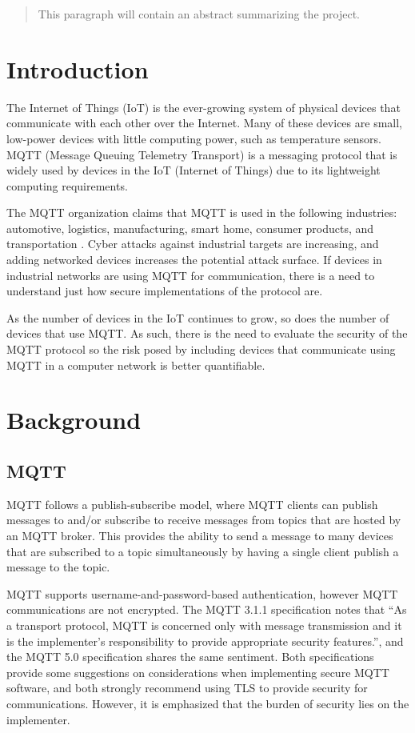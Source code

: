 \documentclass[12pt]{article}
\begin{document}

\begin{abstract}
	This paragraph will contain an abstract summarizing the project.
\end{abstract}

\tableofcontents
\section*{Introduction}
The Internet of Things (IoT) is the ever-growing system of physical devices that communicate with each other over the Internet.  Many of these devices are small, low-power devices with little computing power, such as temperature sensors. MQTT (Message Queuing Telemetry Transport) is a messaging protocol that is widely used by devices in the IoT (Internet of Things) due to its lightweight computing requirements. \par

The MQTT organization claims that MQTT is used in the following industries: automotive, logistics, manufacturing, smart home, consumer products, and transportation \cite{mqtt-org}. Cyber attacks against industrial targets are increasing, and adding networked devices increases the potential attack surface. If devices in industrial networks are using MQTT for communication, there is a need to understand just how secure implementations of the protocol are.\par
As the number of devices in the IoT continues to grow, so does the number of devices that use MQTT. As such, there is the need to evaluate the security of the MQTT protocol so the risk posed by including devices that communicate using MQTT in a computer network is better quantifiable.
\section*{Background}
\subsection*{MQTT}
MQTT follows a publish-subscribe model, where MQTT clients can publish messages to and/or subscribe to receive messages from topics that are hosted by an MQTT broker. This provides the ability to send a message to many devices that are subscribed to a topic simultaneously by having a single client publish a message to the topic. \par
MQTT supports username-and-password-based authentication, however MQTT communications are not encrypted. The MQTT 3.1.1 specification notes that ``As a transport protocol, MQTT is concerned only with message transmission and it is the implementer’s responsibility to provide appropriate security features.''\cite{mqtt3.1.1}, and the MQTT 5.0 specification shares the same sentiment\cite{mqtt5.0}. Both specifications provide some suggestions on considerations when implementing secure MQTT software, and both strongly recommend using TLS to provide security for communications. However, it is emphasized that the burden of security lies on the implementer. 
\end{document}
